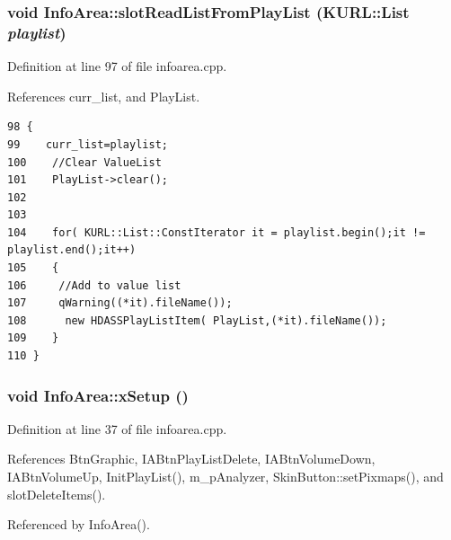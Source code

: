 \subsubsection{\setlength{\rightskip}{0pt plus 5cm}void Info\-Area::slot\-Read\-List\-From\-Play\-List (KURL::List {\em playlist})\hspace{0.3cm}{\tt  [slot]}}\label{classInfoArea_InfoAreai0}




Definition at line 97 of file infoarea.cpp.

References curr\_\-list, and Play\-List.



\footnotesize\begin{verbatim}98 { 
99    curr_list=playlist;
100    //Clear ValueList
101    PlayList->clear();
102    
103    
104    for( KURL::List::ConstIterator it = playlist.begin();it != playlist.end();it++)
105    {
106     //Add to value list
107     qWarning((*it).fileName());
108      new HDASSPlayListItem( PlayList,(*it).fileName());
109    }
110 }
\end{verbatim}\normalsize 
{}
\subsubsection{\setlength{\rightskip}{0pt plus 5cm}void Info\-Area::x\-Setup ()}\label{classInfoArea_InfoAreaa1}




Definition at line 37 of file infoarea.cpp.

References Btn\-Graphic, IABtn\-Play\-List\-Delete, IABtn\-Volume\-Down, IABtn\-Volume\-Up, Init\-Play\-List(), m\_\-p\-Analyzer, Skin\-Button::set\-Pixmaps(), and slot\-Delete\-Items().

Referenced by Info\-Area().



